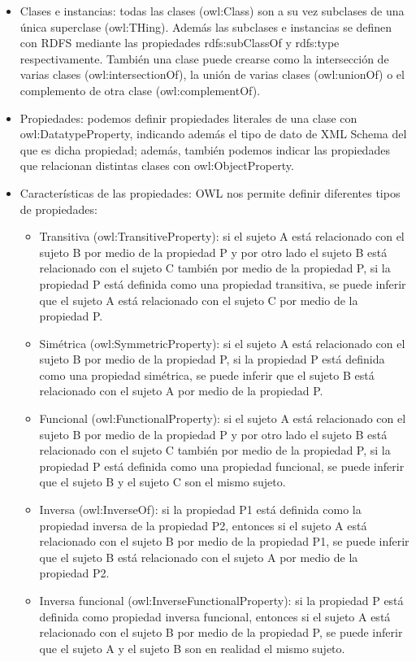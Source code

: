 \begin{itemize}
	\item Clases e instancias: todas las clases (owl:Class) son a su vez subclases de una única superclase (owl:THing). Además las subclases e instancias se definen con RDFS mediante las propiedades rdfs:subClassOf y rdfs:type respectivamente. También una clase puede crearse como la intersección de varias clases (owl:intersectionOf), la unión de varias clases (owl:unionOf) o el complemento de otra clase (owl:complementOf).
	\item Propiedades: podemos definir propiedades literales de una clase con owl:DatatypeProperty, indicando además el tipo de dato de XML Schema del que es dicha propiedad; además, también podemos indicar las propiedades que relacionan distintas clases con owl:ObjectProperty.
	\item Características de las propiedades: OWL nos permite definir diferentes tipos de propiedades:
	\begin{itemize}
		\item Transitiva (owl:TransitiveProperty): si el sujeto A está relacionado con el sujeto B por medio de la propiedad P y por otro lado el sujeto B está relacionado con el sujeto C también por medio de la propiedad P, si la propiedad P está definida como una propiedad transitiva, se puede inferir que el sujeto A está relacionado con el sujeto C por medio de la propiedad P.
		\item Simétrica (owl:SymmetricProperty): si el sujeto A está relacionado con el sujeto B por medio de la propiedad P, si la propiedad P está definida como una propiedad simétrica, se puede inferir que el sujeto B está relacionado con el sujeto A por medio de la propiedad P.
		\item Funcional (owl:FunctionalProperty): si el sujeto A está relacionado con el sujeto B por medio de la propiedad P y por otro lado el sujeto B está relacionado con el sujeto C también por medio de la propiedad P, si la propiedad P está definida como una propiedad funcional, se puede inferir que el sujeto B y el sujeto C son el mismo sujeto.
		\item Inversa (owl:InverseOf): si la propiedad P1 está definida como la propiedad inversa de la propiedad P2, entonces si el sujeto A está relacionado con el sujeto B por medio de la propiedad P1, se puede inferir que el sujeto B está relacionado con el sujeto A por medio de la propiedad P2.
		\item Inversa funcional (owl:InverseFunctionalProperty): si la propiedad P está definida como propiedad inversa funcional, entonces si el sujeto A está relacionado con el sujeto B por medio de la propiedad P, se puede inferir que el sujeto A y el sujeto B son en realidad el mismo sujeto.

\end{itemize}
\end{itemize}
